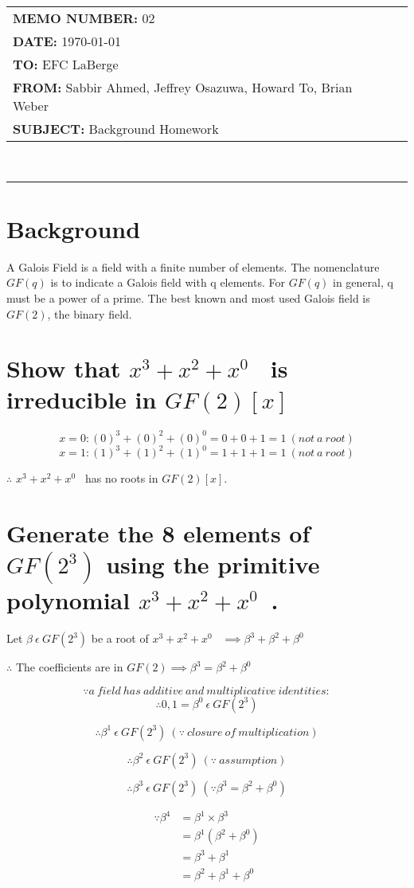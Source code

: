 \documentclass[paper=usletter, fontsize=12pt]{article}
\newcommand{\Sabbir}{Sabbir Ahmed}
\newcommand{\Jeffrey}{Jeffrey Osazuwa}
\newcommand{\Howard}{Howard To}
\newcommand{\Brian}{Brian Weber}
\newcommand{\polynomial}{$x^{3}+x^{2}+x^{0}$}
\newcommand{\documentinfo}[5]{
    \begin{centering}
        \parbox{2in}{
        \begin{spacing}{1}
            \begin{flushleft}
                \begin{tabular}{l l}
                    #1 \\
                    #2 \\
                    #3 \\
                    #4 \\
                    #5 \\
                \end{tabular}\\
                \rule{\textwidth}{1pt}
            \end{flushleft}
        \end{spacing}
        }
    \end{centering}
}
\begin{document}
     \documentinfo{\textbf{MEMO NUMBER:} 02}{\textbf{DATE:} \today}{\textbf{TO: } EFC LaBerge}{\textbf{FROM: }\Sabbir, \Jeffrey, \Howard, \Brian}{\textbf{SUBJECT: } Background Homework}
    \vspace{-0.1in}

    \section{Background}
    A Galois Field is a field with a finite number of elements. The nomenclature $GF(q)$ is to indicate a Galois field with q elements. For $GF(q)$ in general, q must be a power of a prime. The best known and most used Galois field is $GF(2)$, the binary field.

    \section{Show that \polynomial~ is irreducible in $GF(2)[x]$}

        \[ x=0: (0)^{3}+(0)^{2}+(0)^{0}=0+0+1=1 \ (not \ a \ root) \]
        \[ x=1: (1)^{3}+(1)^{2}+(1)^{0}=1+1+1=1 \ (not \ a \ root) \]
        \centerline{$\therefore$ \polynomial~ has no roots in $GF(2)[x]$.}

    \section{Generate the 8 elements of $GF(2^{3})$ using the primitive polynomial \polynomial~.}

        \centerline{Let $\beta \ \epsilon \ GF(2^{3})$ be a root of \polynomial~ $\implies \beta^{3}+\beta^{2}+\beta^{0}$}

        \hspace*{\fill}
        \centerline{$\therefore$ The coefficients are in $GF(2) \implies \beta^{3}=\beta^{2}+\beta^{0}$}

        \[ \because a \ field \ has \ additive \ and \ multiplicative \ identities: \]
        \[ \therefore 0, 1=\beta^{0} \ \epsilon \ GF(2^{3}) \]

        \[ \therefore \beta^{1} \ \epsilon \ GF(2^{3}) \ (\because \ closure \ of \ multiplication) \]

        \[ \therefore \beta^{2} \ \epsilon \ GF(2^{3}) \ (\because \ assumption) \]

        \[ \therefore \beta^{3} \ \epsilon \ GF(2^{3}) \ (\because \beta^{3}=\beta^{2}+\beta^{0}) \]

        \begin{equation*}
            \begin{split}
                \because \beta^{4} & = \beta^{1} \times \beta^{3} \\
                & = \beta^{1} (\beta^{2}+\beta^{0}) \\
                & = \beta^{3}+\beta^{1} \\
                & = \beta^{2}+\beta^{1}+\beta^{0}
            \end{split}
        \end{equation*}
\end{document}
